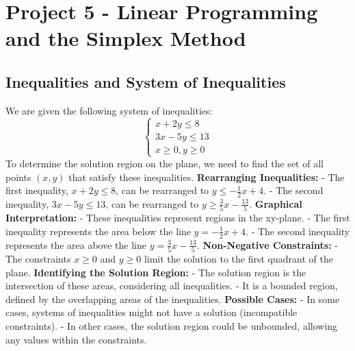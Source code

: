 \documentclass[unicode,11pt,a4paper,oneside,numbers=endperiod,openany]{scrartcl}
\begin{document}
\section{Project 5 - Linear Programming and the Simplex Method}

\subsection{Inequalities and System of Inequalities}
We are given the following system of inequalities:
\begin{equation}
\begin{cases}
x + 2y \leq 8 \\
3x - 5y \leq 13 \\
x \geq 0, y \geq 0
\end{cases}
\end{equation}
To determine the solution region on the plane, we need to find the set of all points \((x, y)\) that satisfy these inequalities.
\newline
\textbf{Rearranging Inequalities:}
- The first inequality, \(x + 2y \leq 8\), can be rearranged to \(y \leq -\frac{1}{2}x + 4\).
- The second inequality, \(3x - 5y \leq 13\), can be rearranged to \(y \geq \frac{3}{5}x - \frac{13}{5}\).
\newline
\textbf{Graphical Interpretation:}
- These inequalities represent regions in the xy-plane.
- The first inequality represents the area below the line \(y = -\frac{1}{2}x + 4\).
- The second inequality represents the area above the line \(y = \frac{3}{5}x - \frac{13}{5}\).
\newline
\textbf{Non-Negative Constraints:}
- The constraints \(x \geq 0\) and \(y \geq 0\) limit the solution to the first quadrant of the plane.
\newline
\textbf{Identifying the Solution Region:}
- The solution region is the intersection of these areas, considering all inequalities.
- It is a bounded region, defined by the overlapping areas of the inequalities.
\newline
\textbf{Possible Cases:}
- In some cases, systems of inequalities might not have a solution (incompatible constraints).
- In other cases, the solution region could be unbounded, allowing any values within the constraints.
\end{document}
